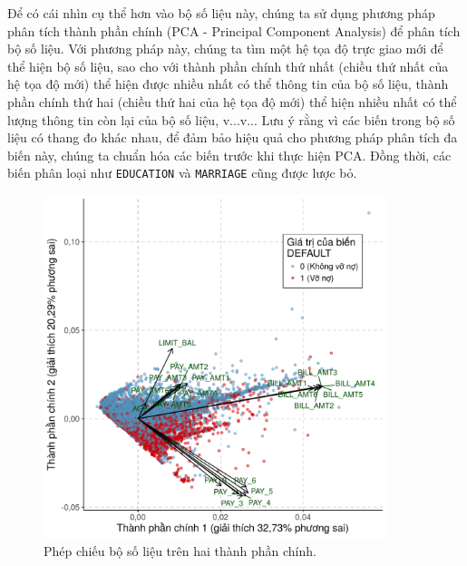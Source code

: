\documentclass[a4paper]{report}\usepackage[]{graphicx}\usepackage[]{color}
\newenvironment{knitrout}{}{} %
\begin{document}
Để có cái nhìn cụ thể hơn vào bộ số liệu này, chúng ta sử dụng phương pháp phân tích thành phần chính (PCA - Principal Component Analysis) để phân tích bộ số liệu.
Với phương pháp này, chúng ta tìm một hệ tọa độ trực giao mới để thể hiện bộ số liệu, sao cho với thành phần chính thứ nhất (chiều thứ nhất của hệ tọa độ mới) thể hiện được nhiều nhất có thể thông tin của bộ số liệu, thành phần chính thứ hai (chiều thứ hai của hệ tọa độ mới) thể hiện nhiều nhất có thể lượng thông tin còn lại của bộ số liệu, v...v... Lưu ý rằng vì các biến trong bộ số liệu có thang đo khác nhau, để đảm bảo hiệu quả cho phương pháp phân tích đa biến này, chúng ta chuẩn hóa các biến trước khi thực hiện PCA. Đồng thời, các biến phân loại như \texttt{EDUCATION} và \texttt{MARRIAGE} cũng được lược bỏ.

\begin{figure}[h]
\centering
\capstart
\begin{knitrout}\small
{}\color{fgcolor}
\includegraphics[width=10cm,height=10cm]{Figures/pca-1} 

\end{knitrout}
\caption{Phép chiếu bộ số liệu trên hai thành phần chính.}
\label{fig:pca}
\end{figure}
\end{document}
